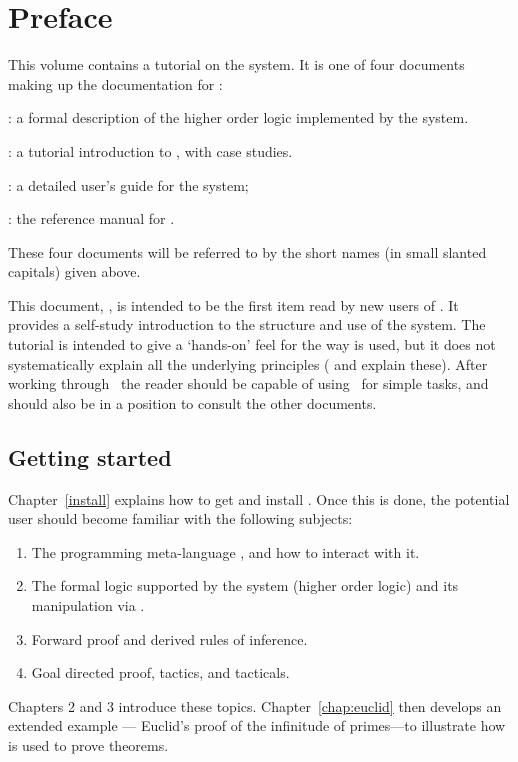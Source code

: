 \chapter*{Preface}
\label{intro}

This volume contains a tutorial on the \HOL{} system.  It is one of four
documents making up the documentation for \HOL:

\begin{myenumerate}
\item \LOGIC: a formal description of the higher order logic
  implemented by the \HOL{} system.
\item \TUTORIAL: a tutorial introduction to \HOL, with case studies.
\item \DESCRIPTION: a detailed user's guide for the \HOL{} system;
\item \REFERENCE: the reference manual for \HOL.
\end{myenumerate}

\noindent These four documents will be referred to by the short names (in
small slanted capitals) given above.

This document, \TUTORIAL, is intended to be the first item read by new
users of \HOL.  It provides a self-study introduction to the structure
and use of the system.  The tutorial is intended to give a `hands-on'
feel for the way \HOL{} is used, but it does not systematically
explain all the underlying principles (\DESCRIPTION{} and \LOGIC{}
explain these).  After working through \TUTORIAL\ the reader should be
capable of using \HOL\ for simple tasks, and should also be in a
position to consult the other documents.

\section*{Getting started}

Chapter~\ref{install} explains how to get and install \HOL.  Once this
is done, the potential \HOL{} user should become familiar with the
following subjects:
%
\begin{enumerate}
\item The programming meta-language \ML, and how to interact with it.
\item The formal logic supported by the \HOL{} system (higher order
  logic) and its manipulation via \ML.
\item Forward proof and derived rules of inference.
\item Goal directed proof, tactics, and tacticals.
\end{enumerate}
%
Chapters 2 and 3 introduce these topics.
Chapter~\ref{chap:euclid} then develops an extended example --- Euclid's
proof of the infinitude of primes---to illustrate how \HOL{} is used
to prove theorems.

